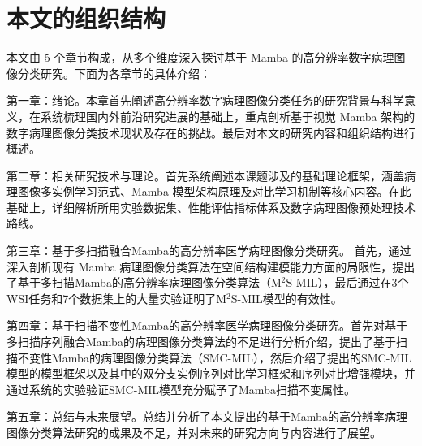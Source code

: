 \section[\hspace{-2pt}本文组织结构]{{\heiti{} \hspace{-8pt}本文的组织结构}}\label{section1: 本文组织结构}

本文由 5 个章节构成，从多个维度深入探讨基于 Mamba 的高分辨率数字病理图像分类研究。下面为各章节的具体介绍：

第一章：绪论。本章首先阐述高分辨率数字病理图像分类任务的研究背景与科学意义，在系统梳理国内外前沿研究进展的基础上，重点剖析基于视觉 Mamba 架构的数字病理图像分类技术现状及存在的挑战。最后对本文的研究内容和组织结构进行概述。

第二章：相关研究技术与理论。首先系统阐述本课题涉及的基础理论框架，涵盖病理图像多实例学习范式、Mamba 模型架构原理及对比学习机制等核心内容。在此基础上，详细解析所用实验数据集、性能评估指标体系及数字病理图像预处理技术路线。

第三章：基于多扫描融合Mamba的高分辨率医学病理图像分类研究。
首先，通过深入剖析现有 Mamba 病理图像分类算法在空间结构建模能力方面的局限性，提出了基于多扫描Mamba的高分辨率病理图像分类算法（M$^2$S-MIL），最后通过在3个WSI任务和7个数据集上的大量实验证明了M$^2$S-MIL模型的有效性。

第四章：基于扫描不变性Mamba的高分辨率医学病理图像分类研究。首先对基于多扫描序列融合Mamba的病理图像分类算法的不足进行分析介绍，提出了基于扫描不变性Mamba的病理图像分类算法（SMC-MIL），然后介绍了提出的SMC-MIL模型的模型框架以及其中的双分支实例序列对比学习框架和序列对比增强模块，并通过系统的实验验证SMC-MIL模型充分赋予了Mamba扫描不变属性。

第五章：总结与未来展望。总结并分析了本文提出的基于Mamba的高分辨率病理图像分类算法研究的成果及不足，并对未来的研究方向与内容进行了展望。

